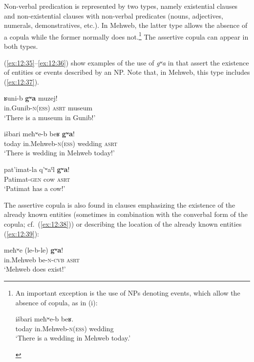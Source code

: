 ﻿\documentclass[output=paper]{langsci/langscibook}
\begin{document}
Non-verbal predication is represented by two types, namely existential
clauses and non-existential clauses with non-verbal predicates (nouns,
adjectives, numerals, demonstratives, etc.). In Mehweb, the latter type
allows the absence of a copula while the former normally does
not.\footnote{An important exception is the use of NPs denoting events,
  which allow the absence of copula, as in (i):

  \begin{exe}
    \gll išbari meħʷe-b beʁ.\\
  today in.Mehweb-\textsc{n}(\textsc{ess}) wedding\\
  \glt   `There is a wedding in Mehweb today.'
\end{exe}


  \removelastskip
  \vspace{-\baselineskip}
} The assertive copula can appear
in both types.

  (\ref{ex:12:35}–\ref{ex:12:36}) show examples of the use of \emph{gʷa} in  that assert the existence of entities or events described
by an NP. Note that, in Mehweb, this type includes  (\ref{ex:12:37}).

\ea \label{ex:12:35} %
\gll ʁuni-b \textbf{gʷa} muzej!\\
in.Gunib-\textsc{n}(\textsc{ess}) \textsc{asrt} museum\\
\glt `There is a museum in Gunib!'

\ex \label{ex:12:36} %
\gll išbari meħʷe-b beʁ \textbf{gʷa}!\\
today in.Mehweb-\textsc{n}(\textsc{ess}) wedding \textsc{asrt}\\
\glt `There is wedding in Mehweb today!'

\ex \label{ex:12:37} %
\gll pat'imat-la q'ʷaˤl \textbf{gʷa}!\\
Patimat-\textsc{gen} cow \textsc{asrt}\\
\glt `Patimat has a cow!'
\z

The assertive copula is also found in clauses emphasizing the existence
of the already known entities (sometimes in combination with the
converbal form of the copula; cf.\ (\ref{ex:12:38})) or describing the location of
the already known entities (\ref{ex:12:39}):

\ea \label{ex:12:38} %
\gll meħʷe (le-b-le) \textbf{gʷa}!\\
in.Mehweb {be}-\textsc{n}-\textsc{cvb} \textsc{asrt}\\
\glt `Mehweb does exist!'
\end{document}
